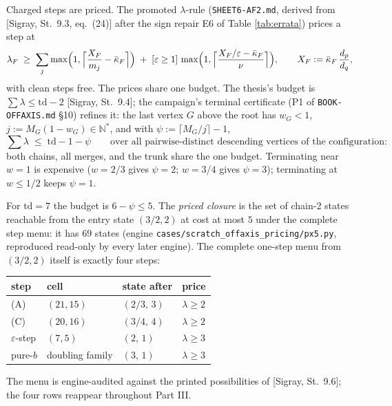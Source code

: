 \documentclass[11pt]{article}
\theoremstyle{definition}
\theoremstyle{remark}
\newcommand{\kb}{\bar\kappa}
\begin{document}
Charged steps are priced. The promoted $\lambda$-rule (\texttt{SHEET6-AF2.md}, derived from [Sigray, St.~9.3, eq.~(24)] after the sign repair E6 of Table \ref{tab:errata}) prices a step at
\begin{equation}\label{eq:af2}
\lambda_F\;\geq\;\sum_j \max\Bigl(1,\Bigl\lceil \frac{X_F}{m_j}-\kb_F\Bigr\rceil\Bigr)\;+\;[\varepsilon\geq1]\,\max\Bigl(1,\Bigl\lceil \frac{X_F/\varepsilon-\kb_F}{\nu}\Bigr\rceil\Bigr),\qquad X_F:=\kb_F\,\frac{d_p}{d_q},
\end{equation}
with clean steps free. The prices share one budget. The thesis's budget is $\sum\lambda\leq \mathrm{td}-2$ [Sigray, St.~9.4]; the campaign's terminal certificate (P1 of \texttt{BOOK-OFFAXIS.md} \S10) refines it: the last vertex $G$ above the root has $w_G<1$, $j:=M_G(1-w_G)\in\mathbb{N}^{*}$, and with $\psi:=\lceil M_G/j\rceil-1$,
\begin{equation}\label{eq:budget}
\sum\lambda\;\leq\;\mathrm{td}-1-\psi\qquad\text{over all pairwise-distinct descending vertices of the configuration:}
\end{equation}
both chains, all merges, and the trunk share the one budget. Terminating near $w=1$ is expensive ($w=2/3$ gives $\psi=2$; $w=3/4$ gives $\psi=3$); terminating at $w\leq 1/2$ keeps $\psi=1$.

For $\mathrm{td}=7$ the budget is $6-\psi\leq 5$. The \emph{priced closure} is the set of chain-2 states reachable from the entry state $(3/2,2)$ at cost at most $5$ under the complete step menu: it has $69$ states (engine \texttt{cases/scratch\_offaxis\_pricing/px5.py}, reproduced read-only by every later engine). The complete one-step menu from $(3/2,2)$ itself is exactly four steps:
\begin{center}
\begin{tabular}{llll}
\toprule
step & cell & state after & price\\
\midrule
(A) & $(21,15)$ & $(2/3,\,3)$ & $\lambda\geq 2$\\
(C) & $(20,16)$ & $(3/4,\,4)$ & $\lambda\geq 2$\\
$\varepsilon$-step & $(7,5)$ & $(2,\,1)$ & $\lambda\geq 3$\\
pure-$b$ & doubling family & $(3,\,1)$ & $\lambda\geq 3$\\
\bottomrule
\end{tabular}
\end{center}
The menu is engine-audited against the printed possibilities of [Sigray, St.~9.6]; the four rows reappear throughout Part III.
\end{document}
